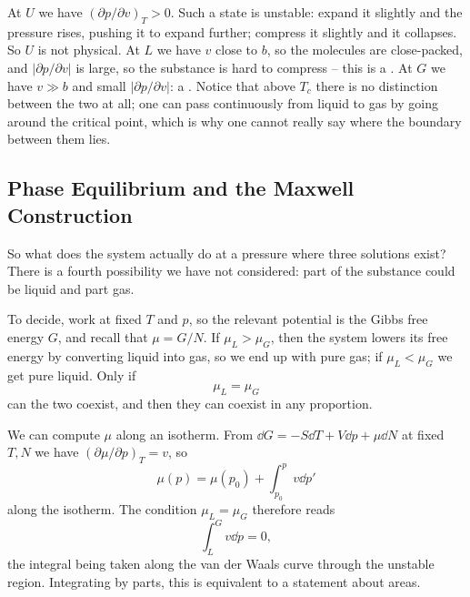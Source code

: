 \begin{center}
\end{center}

At $U$ we have $(\partial p/\partial v)_T > 0$. Such a state is unstable: expand it slightly and the pressure rises, pushing it to expand further; compress it slightly and it collapses. So $U$ is not physical. At $L$ we have $v$ close to $b$, so the molecules are close-packed, and $|\partial p/\partial v|$ is large, so the substance is hard to compress -- this is a . At $G$ we have $v \gg b$ and small $|\partial p/\partial v|$: a . Notice that above $T_c$ there is no distinction between the two at all; one can pass continuously from liquid to gas by going around the critical point, which is why one cannot really say where the boundary between them lies.

\subsection{Phase Equilibrium and the Maxwell Construction}

So what does the system actually do at a pressure where three solutions exist? There is a fourth possibility we have not considered: part of the substance could be liquid and part gas.

To decide, work at fixed $T$ and $p$, so the relevant potential is the Gibbs free energy $G$, and recall that $\mu = G/N$. If $\mu_L > \mu_G$, then the system lowers its free energy by converting liquid into gas, so we end up with pure gas; if $\mu_L < \mu_G$ we get pure liquid. Only if
$$
\mu_L = \mu_G
$$
can the two coexist, and then they can coexist in any proportion.

We can compute $\mu$ along an isotherm. From $\dd G = -S\dd T + V\dd p + \mu \dd N$ at fixed $T,N$ we have $(\partial \mu/\partial p)_T = v$, so
$$
\mu(p) = \mu(p_0) + \int_{p_0}^{p}v\dd p'
$$
along the isotherm. The condition $\mu_L = \mu_G$ therefore reads
$$
\int_{L}^{G} v \dd p = 0,
$$
the integral being taken along the van der Waals curve through the unstable region. Integrating by parts, this is equivalent to a statement about areas.


